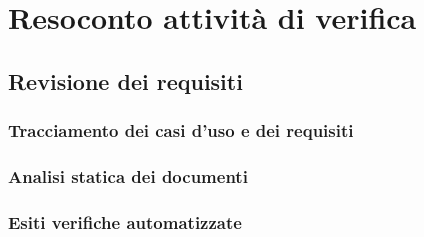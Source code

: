 \section{Resoconto attività di verifica}
\subsection{Revisione dei requisiti}
\subsubsection{Tracciamento dei casi d'uso e dei requisiti}
\subsubsection{Analisi statica dei documenti}
\subsubsection{Esiti verifiche automatizzate}